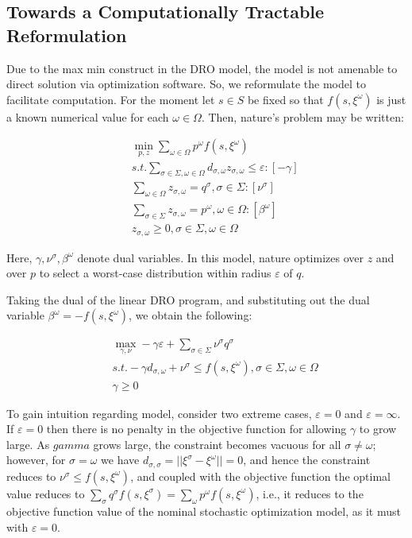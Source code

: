 \subsection{Towards a Computationally Tractable Reformulation}
\label{subsec:TractableReformulation}
Due to the max min construct in the DRO model, the model is not amenable to direct solution
via optimization software. So, we reformulate the model to facilitate computation.
For the moment let $s\in S$ be fixed so that $f(s, \xi^\omega)$ is just a known numerical
value for each $\omega \in \Omega$. Then, nature’s problem may be written:

\begin{subequations}
\begin{eqnarray}
& & \min_{p, z} \sum_{\omega \in \Omega} p^\omega f(s, \xi^\omega) \\
& & s.t. \sum_{\sigma \in \Sigma, \omega \in \Omega} d_{\sigma, \omega} z_{\sigma, \omega} \le \varepsilon : [-\gamma] \\
& & \sum_{\omega \in \Omega} z_{\sigma, \omega} = q^\sigma, \sigma \in \Sigma : [\nu^\sigma]\\
& & \sum_{\sigma \in \Sigma} z_{\sigma, \omega} = p^\omega, \omega \in \Omega : [\beta^\omega]\\
& & z_{\sigma, \omega} \ge 0, \sigma \in \Sigma, \omega \in \Omega
\end{eqnarray}
\end{subequations}

Here, $\gamma, \nu^\sigma, \beta^\omega$ denote dual variables.
In this model, nature optimizes over $z$ and over $p$ to select a worst-case distribution
within radius $\varepsilon$ of $q$.

Taking the dual of the linear DRO program, and substituting out the dual variable
$\beta^\omega= -f(s, \xi^\omega)$, we obtain the following:

\begin{subequations}\label{dualProlem}
\begin{eqnarray}
& & \max_{\gamma, \nu} -\gamma \varepsilon + \sum_{\sigma\in \Sigma} \nu^\sigma q^\sigma \\
& & s.t. -\gamma d_{\sigma, \omega} + \nu^\sigma \le f(s, \xi^\omega), \sigma \in \Sigma, \omega \in \Omega \\
& & \gamma \ge 0
\end{eqnarray}
\end{subequations}

To gain intuition regarding model, consider two extreme cases, $\varepsilon = 0$ and $\varepsilon = \infty$.
If $\varepsilon = 0$ then there is no penalty in the objective function for allowing $\gamma$
to grow large. As $gamma$ grows large, the constraint becomes vacuous for all $\sigma \ne \omega$;
however, for $\sigma = \omega$ we have $d_{\sigma, \sigma} = ||\xi^\sigma - \xi^\omega|| = 0$,
and hence the constraint reduces to $\nu^\sigma \le f(s, \xi^\omega)$, and coupled with the objective
function the optimal value reduces to $\sum_\sigma q^\sigma f(s, \xi^\sigma) = \sum_\omega p^\omega f(s, \xi^\omega)$,
i.e., it reduces to the objective function value of the nominal stochastic optimization model,
as it must with $\varepsilon = 0$.

